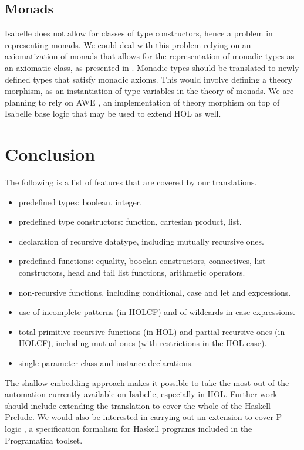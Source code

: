 \documentclass[a4paper,12pt]{article}
\begin{document}
\subsection{Monads}
\label{sec:Monads}

Isabelle does not allow for classes of type constructors, hence a
problem in representing monads. We could deal with this problem
relying on an axiomatization of monads that allows for the
representation of monadic types as an axiomatic class, as presented in
\cite{Lueth}. Monadic types should be translated to newly defined
types that satisfy monadic axioms. This would involve defining a
theory morphism, as an instantiation of type variables in the theory
of monads. We are planning to rely on AWE \cite{AWE}, an
implementation of theory morphism on top of Isabelle base logic that
may be used to extend HOL as well.


\section{Conclusion}

The following is a list of features that are covered by our
translations.

\begin{itemize} 
\item predefined types: boolean, integer.
\item predefined type constructors: function, cartesian product, list.
\item declaration of recursive datatype, including mutually recursive ones.
\item predefined functions: equality, booelan constructors,
  connectives, list constructors, head and tail list functions,
  arithmetic operators.
\item non-recursive functions, including conditional, case and let and
  expressions.
\item use of incomplete patterns (in HOLCF) and of wildcards in case
  expressions.
\item total primitive recursive functions (in HOL)
and partial recursive ones (in HOLCF), including mutual ones (with
restrictions in the HOL case).
\item single-parameter class and instance declarations.
\end{itemize}


The shallow embedding approach makes it possible to take the most out
of the automation currently available on Isabelle, especially in HOL.
Further work should include extending the translation to cover the
whole of the Haskell Prelude. We would also be interested in carrying
out an extension to cover P-logic \cite{KiebPl}, a specification
formalism for Haskell programs included in the Programatica toolset.




\end{document}

